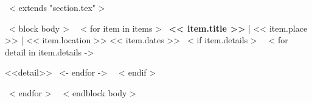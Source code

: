 ~< extends "section.tex" >~

~< block body >~
    ~< for item in items >~
      \textbf{<< item.title >>} | << item.place >> | << item.location >> \hfill << item.dates >>
        ~< if item.details >~
            ~< for detail in item.details ->~
                \par <<detail>>
            ~<- endfor ->~
        ~< endif >~
        \par
    ~< endfor >~
~< endblock body >~
